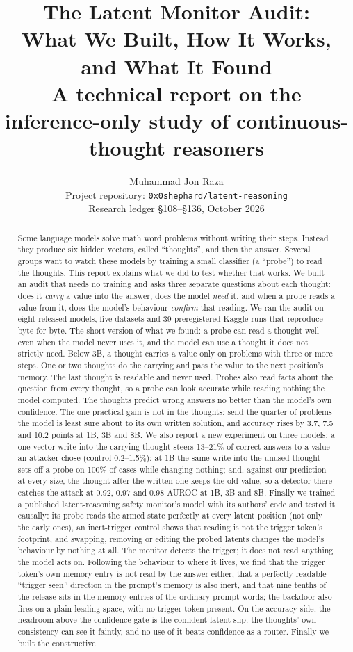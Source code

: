 \documentclass{article}
\title{The Latent Monitor Audit:\\What We Built, How It Works, and What It Found\\[4pt]\large A technical report on the inference-only study of continuous-thought reasoners}
\author{%
  Muhammad Jon Raza\\
  Project repository: \texttt{0x0shephard/latent-reasoning}\\
  Research ledger \S108--\S136, October 2026\\
}
\begin{document}
\maketitle

\begin{abstract}
Some language models solve math word problems without writing their steps. Instead they produce six hidden vectors, called ``thoughts'', and then the answer. Several groups want to watch these models by training a small classifier (a ``probe'') to read the thoughts. This report explains what we did to test whether that works. We built an audit that needs no training and asks three separate questions about each thought: does it \emph{carry} a value into the answer, does the model \emph{need} it, and when a probe reads a value from it, does the model's behaviour \emph{confirm} that reading. We ran the audit on eight released models, five datasets and 39 preregistered Kaggle runs that reproduce byte for byte. The short version of what we found: a probe can read a thought well even when the model never uses it, and the model can use a thought it does not strictly need. Below 3B, a thought carries a value only on problems with three or more steps. One or two thoughts do the carrying and pass the value to the next position's memory. The last thought is readable and never used. Probes also read facts about the question from every thought, so a probe can look accurate while reading nothing the model computed. The thoughts predict wrong answers no better than the model's own confidence. The one practical gain is not in the thoughts: send the quarter of problems the model is least sure about to its own written solution, and accuracy rises by 3.7, 7.5 and 10.2 points at 1B, 3B and 8B. We also report a new experiment on three models: a one-vector write into the carrying thought steers 13--21\% of correct answers to a value an attacker chose (control 0.2--1.5\%); at 1B the same write into the unused thought sets off a probe on 100\% of cases while changing nothing; and, against our prediction at every size, the thought after the written one keeps the old value, so a detector there catches the attack at 0.92, 0.97 and 0.98 AUROC at 1B, 3B and 8B. Finally we trained a published latent-reasoning safety monitor's model with its authors' code and tested it causally: its probe reads the armed state perfectly at every latent position (not only the early ones), an inert-trigger control shows that reading is not the trigger token's footprint, and swapping, removing or editing the probed latents changes the model's behaviour by nothing at all. The monitor detects the trigger; it does not read anything the model acts on. Following the behaviour to where it lives, we find that the trigger token's own memory entry is not read by the answer either, that a perfectly readable ``trigger seen'' direction in the prompt's memory is also inert, and that nine tenths of the release sits in the memory entries of the ordinary prompt words; the backdoor also fires on a plain leading space, with no trigger token present. On the accuracy side, the headroom above the confidence gate is the confident latent slip: the thoughts' own consistency can see it faintly, and no use of it beats confidence as a router. Finally we built the constructive 
\end{abstract}
\end{document}
